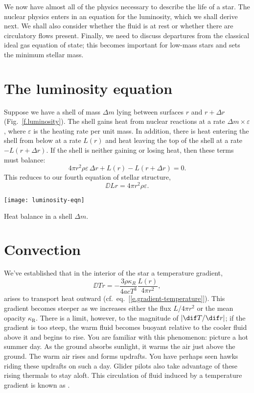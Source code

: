 
We now have almost all of the physics necessary to describe the life of a star. 
The nuclear physics enters in an equation for the luminosity, which we shall derive next. We shall also consider whether the fluid is at rest or whether there are circulatory flows present. Finally, we need to discuss departures from the classical ideal gas equation of state; this becomes important for low-mass stars and sets the minimum stellar mass.

\section{The luminosity equation}

Suppose we have a shell of mass $\Delta m$ lying between surfaces $r$ and $r+\Delta r$ (Fig.~\ref{f.luminosity}). The shell gains heat from nuclear reactions at a rate $\Delta m \times \varepsilon$, where $\varepsilon$ is the heating rate per unit mass.  In addition, there is heat entering the shell from below at a rate $L(r)$ and heat leaving the top of the shell at a rate $-L(r+\Delta r)$.
If the shell is neither gaining or losing heat, then these terms must balance:
\[ 4\pi r^{2}\rho\varepsilon\,\Delta r + L(r) - L(r+\Delta r) = 0. \]
This reduces to our fourth equation of stellar structure,
\[
\DD{L}{r} = 4\pi r^{2}\rho\varepsilon.
\]
\begin{marginfigure}
\texttt{[image: luminosity-eqn]}
\caption[Heat balance in a mass shell]{Heat balance in a shell $\Delta m$.}
\label{f.luminosity}
\end{marginfigure}

\section{Convection}\label{s.convection}

We've established that in the interior of the star a temperature gradient,
\[
	\DD{T}{r} = -\frac{3\rho\kappa_{R}}{4acT^3}\frac{L(r)}{4\pi r^2},
\]
arises to transport heat outward (cf.\ eq.~[\ref{e.gradient-temperature}]).
This gradient becomes steeper as we increases either the flux $L/4\pi r^{2}$ or the mean opacity $\kappa_{\mathrm{R}}$. There is a limit, however, to the magnitude of $|\dif T/\dif r|$; if the gradient is too steep, the warm fluid becomes buoyant relative to the cooler fluid above it and begins to rise. You are familiar with this phenomenon: picture a hot summer day. As the ground absorbs sunlight, it warms the air just above the ground. The warm air rises and forms updrafts. You have perhaps seen hawks riding these updrafts on such a day. Glider pilots also take advantage of these rising thermals to stay aloft. This circulation of fluid induced by a temperature gradient is known as . 

